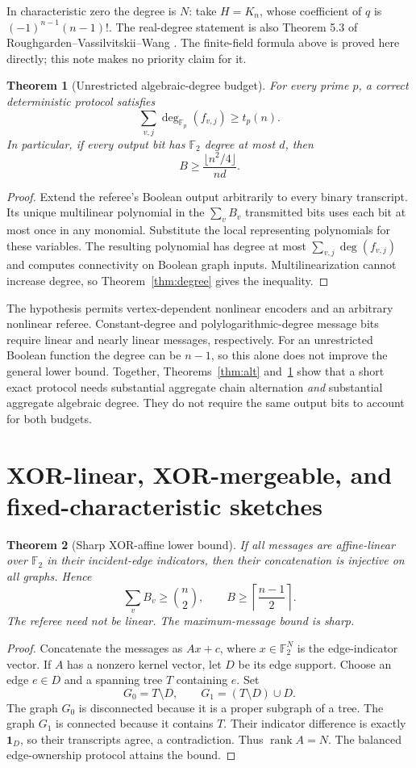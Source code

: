 \documentclass[11pt]{article}
\newtheorem{theorem}{Theorem}[section]
\theoremstyle{definition}\newtheorem{definition}[theorem]{Definition}
\theoremstyle{remark}\newtheorem{remark}[theorem]{Remark}
\newcommand{\F}{\mathbb F}
\newcommand{\rank}{\operatorname{rank}}
\begin{document}
In characteristic zero the degree is $N$: take $H=K_n$, whose coefficient of $q$ is $(-1)^{n-1}(n-1)!$. The real-degree statement is also Theorem 5.3 of Roughgarden--Vassilvitskii--Wang \cite{RVW17}. The finite-field formula above is proved here directly; this note makes no priority claim for it.

\begin{theorem}[Unrestricted algebraic-degree budget]\label{thm:degreebudget}
For every prime $p$, a correct deterministic protocol satisfies
\[
 \boxed{\sum_{v,j}\deg_{\F_p}(f_{v,j})\ge t_p(n).}
\]
In particular, if every output bit has $\F_2$ degree at most $d$, then
\[
 \boxed{B\ge\frac{\lfloor n^2/4\rfloor}{nd}.}
\]
\end{theorem}
\begin{proof}
Extend the referee's Boolean output arbitrarily to every binary transcript. Its unique multilinear polynomial in the $\sum_v B_v$ transmitted bits uses each bit at most once in any monomial. Substitute the local representing polynomials for these variables. The resulting polynomial has degree at most $\sum_{v,j}\deg(f_{v,j})$ and computes connectivity on Boolean graph inputs. Multilinearization cannot increase degree, so Theorem~\ref{thm:degree} gives the inequality.
\end{proof}

The hypothesis permits vertex-dependent nonlinear encoders and an arbitrary nonlinear referee. Constant-degree and polylogarithmic-degree message bits require linear and nearly linear messages, respectively. For an unrestricted Boolean function the degree can be $n-1$, so this alone does not improve the general lower bound. Together, Theorems~\ref{thm:alt} and~\ref{thm:degreebudget} show that a short exact protocol needs substantial aggregate chain alternation \emph{and} substantial aggregate algebraic degree. They do not require the same output bits to account for both budgets.

\section{XOR-linear, XOR-mergeable, and fixed-characteristic sketches}
\begin{theorem}[Sharp XOR-affine lower bound]\label{thm:xor}
If all messages are affine-linear over $\F_2$ in their incident-edge indicators, then their concatenation is injective on all graphs. Hence
\[
 \sum_v B_v\ge\binom n2,
 \qquad B\ge\left\lceil\frac{n-1}{2}\right\rceil.
\]
The referee need not be linear. The maximum-message bound is sharp.
\end{theorem}
\begin{proof}
Concatenate the messages as $Ax+c$, where $x\in\F_2^N$ is the edge-indicator vector. If $A$ has a nonzero kernel vector, let $D$ be its edge support. Choose an edge $e\in D$ and a spanning tree $T$ containing $e$. Set
\[
 G_0=T\setminus D,\qquad G_1=(T\setminus D)\cup D.
\]
The graph $G_0$ is disconnected because it is a proper subgraph of a tree. The graph $G_1$ is connected because it contains $T$. Their indicator difference is exactly $\mathbf1_D$, so their transcripts agree, a contradiction. Thus $\rank A=N$. The balanced edge-ownership protocol attains the bound.
\end{proof}
\end{document}
